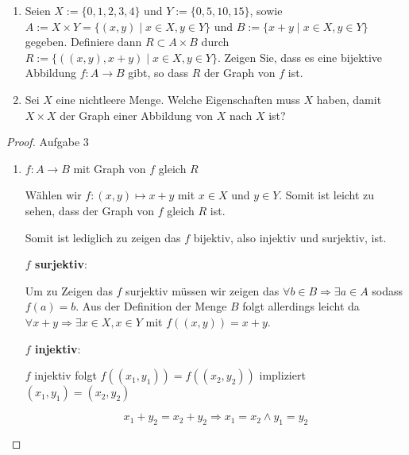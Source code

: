 \documentclass{../problemset}
\begin{document}
\pagebreak

\begin{problem}[Graphen]
\begin{enumerate}
	\item Seien $X := \{0, 1, 2, 3, 4\}$ und $Y := \{0, 5, 10, 15\}$, sowie $A := X \times Y = \{(x, y) \mid x \in X, y \in Y\}$ und $B := \{x + y \mid x \in X, y \in Y\}$ gegeben. Definiere dann $R \subset A \times B$ durch $R := \{((x, y), x + y) \mid x \in X, y \in Y\}$.
	      Zeigen Sie, dass es eine bijektive Abbildung $f : A \to B$ gibt, so dass $R$ der Graph von $f$ ist.

	\item Sei $X$ eine nichtleere Menge. Welche Eigenschaften muss $X$ haben, damit $X \times X$ der Graph einer Abbildung von $X$ nach $X$ ist?

\end{enumerate}

\begin{proof} Aufgabe 3

	\begin{enumerate}
		\item $f: A \rightarrow B$ mit Graph von $f$ gleich $R$

		      Wählen wir $f : (x, y) \mapsto x + y$ mit $x \in X$ und $y \in Y$.
		      Somit ist leicht zu sehen, dass der Graph von $f$ gleich $R$ ist.

		      Somit ist lediglich zu zeigen das $f$ bijektiv, also injektiv und surjektiv, ist.

		      \textbf{$f$ surjektiv}:

		      Um zu Zeigen das $f$ surjektiv müssen wir zeigen das $\forall b \in B \Rightarrow \exists a \in A$ sodass $f(a) = b$.
		      Aus der Definition der Menge $B$ folgt allerdings leicht da $\forall x + y \Rightarrow \exists x \in X, x \in Y$ mit $f((x,y)) = x + y$.

		      \textbf{$f$ injektiv}:

		      $f$ injektiv folgt $f((x_1,y_1)) = f((x_2, y_2))$ impliziert $(x_1, y_1) = (x_2, y_2)$

              \[
                x_1 + y_2 = x_2 + y_2 \Rightarrow x_1 = x_2 \land y_1 = y_2
              \]


	\end{enumerate}

\end{proof}

\end{problem}
\end{document}
